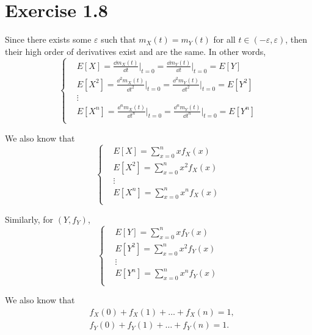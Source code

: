 \section*{Exercise 1.8}
Since there exists some $\varepsilon$ such that $m_X(t)=m_Y(t)$ for all $t\in (-\varepsilon,\varepsilon)$, then their high order of derivatives exist and are the same. In other words,
\[
    \left\{
    \begin{aligned}
        &E[X]=\frac{\dd m_X(t)}{\dd t}\bigg|_{t=0}=\frac{\dd m_Y(t)}{\dd t}\bigg|_{t=0}=E[Y]\\
        &E[X^2]=\frac{\dd^2 m_X(t)}{\dd t^2}\bigg|_{t=0}=\frac{\dd^2 m_Y(t)}{\dd t^2}\bigg|_{t=0}=E[Y^2]\\
        &\vdots\\
        &E[X^{n}]=\frac{\dd^n m_X(t)}{\dd t^n}\bigg|_{t=0}=\frac{\dd^n m_Y(t)}{\dd t^n}\bigg|_{t=0}=E[Y^{n}]\\
    \end{aligned}
    \right.
\]

We also know that
\begin{equation}\label{eq1}
    \left\{
    \begin{aligned}
        &E[X]=\sum_{x=0}^nxf_X(x)\\
        &E[X^2]=\sum_{x=0}^nx^2f_X(x)\\
        &\vdots\\
        &E[X^n]=\sum_{x=0}^nx^nf_X(x)\\
    \end{aligned}
    \right.
\end{equation}

Similarly, for $(Y,f_Y)$,
\begin{equation}\label{eq2}
    \left\{
    \begin{aligned}
        &E[Y]=\sum_{x=0}^nxf_Y(x)\\
        &E[Y^2]=\sum_{x=0}^nx^2f_Y(x)\\
        &\vdots\\
        &E[Y^n]=\sum_{x=0}^nx^nf_Y(x)\\
    \end{aligned}
    \right.
\end{equation}

We also know that
\begin{equation}\label{eq3}
\begin{split}
    &f_X(0)+f_X(1)+\hdots+f_X(n)=1,\\
    &f_Y(0)+f_Y(1)+\hdots+f_Y(n)=1.
\end{split}
\end{equation}

